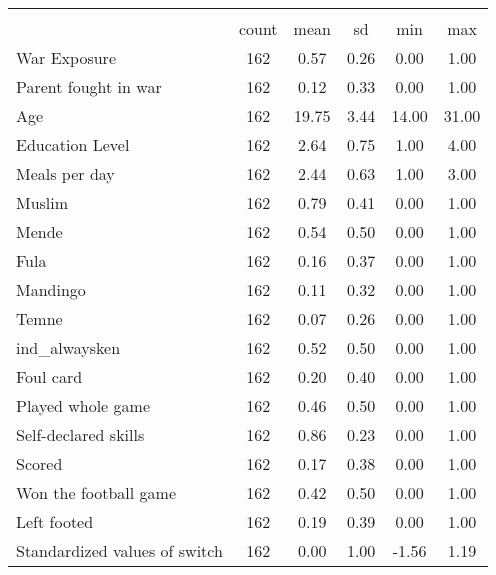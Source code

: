{
\def\sym#1{\ifmmode^{#1}\else\(^{#1}\)\fi}
\begin{tabular}{l*{1}{ccccc}}
\hline\hline
                    &\multicolumn{5}{c}{}                                            \\
                    &       count&        mean&          sd&         min&         max\\
\hline
War Exposure        &         162&        0.57&        0.26&        0.00&        1.00\\
Parent fought in war&         162&        0.12&        0.33&        0.00&        1.00\\
Age                 &         162&       19.75&        3.44&       14.00&       31.00\\
Education Level     &         162&        2.64&        0.75&        1.00&        4.00\\
Meals per day       &         162&        2.44&        0.63&        1.00&        3.00\\
Muslim              &         162&        0.79&        0.41&        0.00&        1.00\\
Mende               &         162&        0.54&        0.50&        0.00&        1.00\\
Fula                &         162&        0.16&        0.37&        0.00&        1.00\\
Mandingo            &         162&        0.11&        0.32&        0.00&        1.00\\
Temne               &         162&        0.07&        0.26&        0.00&        1.00\\
ind\_alwaysken       &         162&        0.52&        0.50&        0.00&        1.00\\
Foul card           &         162&        0.20&        0.40&        0.00&        1.00\\
Played whole game   &         162&        0.46&        0.50&        0.00&        1.00\\
Self-declared skills&         162&        0.86&        0.23&        0.00&        1.00\\
Scored              &         162&        0.17&        0.38&        0.00&        1.00\\
Won the football game&         162&        0.42&        0.50&        0.00&        1.00\\
Left footed         &         162&        0.19&        0.39&        0.00&        1.00\\
Standardized values of switch&         162&        0.00&        1.00&       -1.56&        1.19\\

\end{tabular}}
